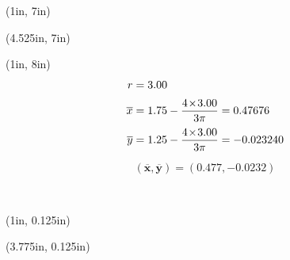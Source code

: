 \documentclass[10pt,oneside]{article}
\def\scale{1}
\begin{document}
\begin{textblock*}{3in}(1in, 7in)
\end{textblock*}
\begin{textblock*}{3.25in}(4.525in, 7in)
	\cbox{
		\centering
		\def\scale{1}
		
	}
\end{textblock*}
\begin{textblock*}{3in}(1in, 8in)
	\large
	\begin{align*}
		r &= 3.00 \\[0.25em]
		\overline{x} &= 1.75-\frac{4\!\times\!3.00}{3\pi}=0.47676 \\[0.25em]
		\overline{y} &= 1.25-\frac{4\!\times\!3.00}{3\pi}=-0.023240
	\end{align*}
	\par
	$$ \bm{\left(\overline{x},\overline{y}\right) = (0.477, -0.0232)} $$
\end{textblock*}

~\newpage

\begin{textblock*}{2.25in}(1in, 0.125in)
\end{textblock*}
\begin{textblock*}{4.125in}(3.775in, 0.125in)
	\cbox{
	\centering
	\def\scale{1}
	
	}
\end{textblock*}
\end{document}
